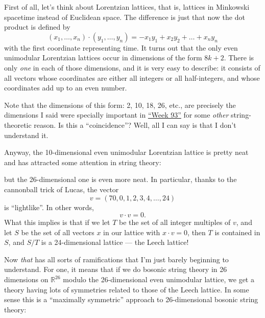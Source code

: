 \documentclass{article}
\def\tightlist{}
\renewcommand{\texttt}[1]{%
  \begingroup
  \ttfamily
  \begingroup\lccode`~=`/\lowercase{\endgroup\def~}{/\discretionary{}{}{}}%
  \begingroup\lccode`~=`[\lowercase{\endgroup\def~}{[\discretionary{}{}{}}%
  \begingroup\lccode`~=`.\lowercase{\endgroup\def~}{.\discretionary{}{}{}}%
  \catcode`/=\active\catcode`[=\active\catcode`.=\active
  \scantokens{#1\noexpand}%
  \endgroup
}
\begin{document}
First of all, let's think about Lorentzian lattices, that is, lattices
in Minkowski spacetime instead of Euclidean space. The difference is
just that now the dot product is defined by
\[(x_1,\ldots,x_n)\cdot(y_1,\ldots,y_n) = -x_1y_1+x_2 y_2+\ldots+x_ny_n\]
with the first coordinate representing time. It turns out that the only
even unimodular Lorentzian lattices occur in dimensions of the form
\(8k + 2\). There is only \emph{one} in each of those dimensions, and it
is very easy to describe: it consists of all vectors whose coordinates
are either all integers or all half-integers, and whose coordinates add
up to an even number.

Note that the dimensions of this form: 2, 10, 18, 26, etc., are
precisely the dimensions I said were specially important in
\protect\hyperlink{week93}{``Week 93''} for some \emph{other}
string-theoretic reason. Is this a ``coincidence''? Well, all I can say
is that I don't understand it.

Anyway, the 10-dimensional even unimodular Lorentzian lattice is pretty
neat and has attracted some attention in string theory:


but the 26-dimensional one is even more neat. In particular, thanks to
the cannonball trick of Lucas, the vector
\[v = (70,0,1,2,3,4,\ldots,24)\] is ``lightlike''. In other words,
\[v\cdot v=0.\] What this implies is that if we let \(T\) be the set of
all integer multiples of \(v\), and let \(S\) be the set of all vectors
\(x\) in our lattice with \(x\cdot v = 0\), then \(T\) is contained in
\(S\), and \(S/T\) is a 24-dimensional lattice --- the Leech lattice!

Now \emph{that} has all sorts of ramifications that I'm just barely
beginning to understand. For one, it means that if we do bosonic string
theory in 26 dimensions on \(\mathbb{R}^{26}\) modulo the 26-dimensional
even unimodular lattice, we get a theory having lots of symmetries
related to those of the Leech lattice. In some sense this is a
``maximally symmetric'' approach to 26-dimensional bosonic string
theory:

\end{document}
